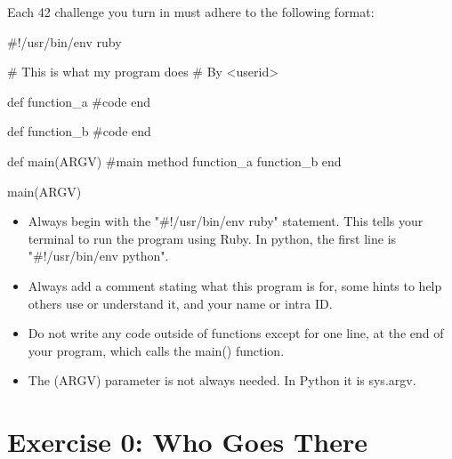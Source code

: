 \documentclass{42-en}
\begin{document}
Each 42 challenge you turn in must adhere to the following format:

\begin{42rbcode}
#!/usr/bin/env ruby

# This is what my program does
# By <userid>

def function_a
 #code
end

def function_b
 #code
end

def main(ARGV)
 #main method
 function_a
 function_b
end

main(ARGV)
\end{42rbcode}

\begin{itemize}
	\item Always begin with the "\#!/usr/bin/env ruby" statement. This tells your terminal to run the program using Ruby. In python, the first line is "\#!/usr/bin/env python".
	\item Always add a comment stating what this program is for, some hints to help others use or understand it, and your name or intra ID.
	\item Do not write any code outside of functions except for one line, at the end of your program, which calls the main() function.
	\item The (ARGV) parameter is not always needed. In Python it is sys.argv.
\end{itemize}


\startexercices



\chapter{Exercise 0: Who Goes There}
\makeheaderfiles
\end{document}
